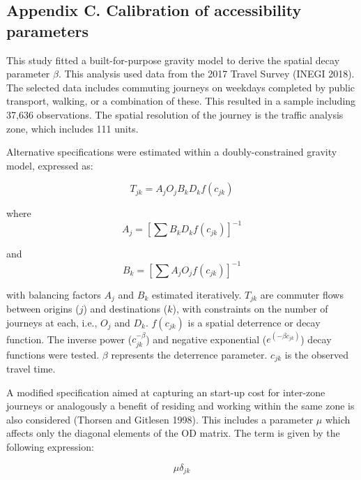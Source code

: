 \documentclass{article}
\begin{document}
\subsection{Appendix C. Calibration of accessibility
parameters}\label{appendix-c.-calibration-of-accessibility-parameters}

This study fitted a built-for-purpose gravity model to derive the
spatial decay parameter \(\beta\). This analysis used data from the 2017
Travel Survey (INEGI 2018). The selected data includes commuting
journeys on weekdays completed by public transport, walking, or a
combination of these. This resulted in a sample including 37,636
observations. The spatial resolution of the journey is the traffic
analysis zone, which includes 111 units.

Alternative specifications were estimated within a doubly-constrained
gravity model, expressed as:

\begin{equation}
  T_{jk} = A_j O_j B_k D_k f(c_{jk})
  \label{eq:gravity-model}
\end{equation}

where \begin{equation} 
  A_j = \left[ \sum{B_k D_k f(c_{jk})} \right]^{-1}
\end{equation}

and \begin{equation} 
  B_k = \left[ \sum{A_j O_j f(c_{jk}) }  \right] ^{-1}
\end{equation}

with balancing factors \(A_j\) and \(B_k\) estimated iteratively.
\(T_{jk}\) are commuter flows between origins (\(j\)) and destinations
(\(k\)), with constraints on the number of journeys at each, i.e.,
\(O_j\) and \(D_k\). \(f(c_{jk})\) is a spatial deterrence or decay
function. The inverse power (\(c_{jk}^{-\beta}\)) and negative
exponential (\(e^{(-\beta c_{jk})}\)) decay functions were tested.
\(\beta\) represents the deterrence parameter. \(c_{jk}\) is the
observed travel time.

A modified specification aimed at capturing an start-up cost for
inter-zone journeys or analogously a benefit of residing and working
within the same zone is also considered (Thorsen and Gitlesen 1998).
This includes a parameter \(\mu\) which affects only the diagonal
elements of the OD matrix. The term is given by the following
expression:

\begin{equation} 
  \mu \delta_{jk}
\end{equation}
\end{document}
